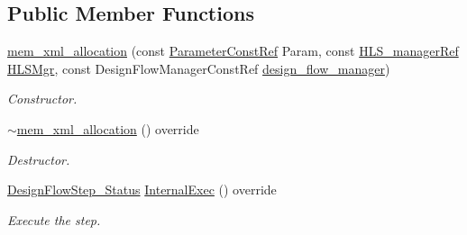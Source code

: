 \subsection*{Public Member Functions}
\begin{DoxyCompactItemize}
\item 
\hyperlink{classmem__xml__allocation_aae45922d425552e133c3e71339b54ad0}{mem\+\_\+xml\+\_\+allocation} (const \hyperlink{Parameter_8hpp_a37841774a6fcb479b597fdf8955eb4ea}{Parameter\+Const\+Ref} Param, const \hyperlink{hls__manager_8hpp_acd3842b8589fe52c08fc0b2fcc813bfe}{H\+L\+S\+\_\+manager\+Ref} \hyperlink{classHLS__step_ade85003a99d34134418451ddc46a18e9}{H\+L\+S\+Mgr}, const Design\+Flow\+Manager\+Const\+Ref \hyperlink{classDesignFlowStep_ab770677ddf087613add30024e16a5554}{design\+\_\+flow\+\_\+manager})
\begin{DoxyCompactList}\small\item\em Constructor. \end{DoxyCompactList}\item 
\hyperlink{classmem__xml__allocation_ae7fbf63ff2adab3c7cc127b095f1c225}{$\sim$mem\+\_\+xml\+\_\+allocation} () override
\begin{DoxyCompactList}\small\item\em Destructor. \end{DoxyCompactList}\item 
\hyperlink{design__flow__step_8hpp_afb1f0d73069c26076b8d31dbc8ebecdf}{Design\+Flow\+Step\+\_\+\+Status} \hyperlink{classmem__xml__allocation_ab52f147c4c950b89428a1c6ad515a7a3}{Internal\+Exec} () override
\begin{DoxyCompactList}\small\item\em Execute the step. \end{DoxyCompactList}\end{DoxyCompactItemize}

